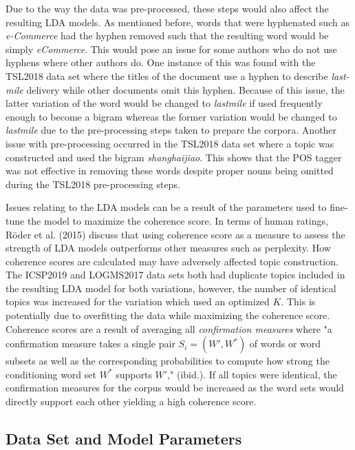 \documentclass[a4paper, 12pt, twoside]{article}
\numberwithin{equation}{section} %
\begin{document}
Due to the way the data was pre-processed, these steps would also affect the resulting LDA models. As mentioned before, words that were hyphenated such as \textit{e-Commerce} had the hyphen removed such that the resulting word would be simply \textit{eCommerce}. This would pose an issue for some authors who do not use hyphens where other authors do. One instance of this was found with the TSL2018 data set where the titles of the document use a hyphen to describe \textit{last-mile} delivery while other documents omit this hyphen. Because of this issue, the latter variation of the word would be changed to \textit{last\textunderscore mile} if used frequently enough to become a bigram whereas the former variation would be changed to \textit{lastmile} due to the pre-processing steps taken to prepare the corpora. Another issue with pre-processing occurred in the TSL2018 data set where a topic was constructed and used the bigram \textit{shanghai\textunderscore jiao}. This shows that the POS tagger was not effective in removing these words despite proper nouns being omitted during the TSL2018 pre-processing steps.  

Issues relating to the LDA models can be a result of the parameters used to fine-tune the model to maximize the coherence score. In terms of human ratings, Röder et al. (2015) discuss that using coherence score as a measure to assess the strength of LDA models outperforms other measures such as perplexity. How coherence scores are calculated may have adversely affected topic construction. The ICSP2019 and LOGMS2017 data sets both had duplicate topics included in the resulting LDA model for both variations, however, the number of identical topics was increased for the variation which used an optimized $K$. This is potentially due to overfitting the data while maximizing the coherence score. Coherence scores are a result of averaging all \textit{confirmation measures} where "a confirmation measure takes a single pair $S_i = (W', W^*)$ of words or word subsets as well as the corresponding probabilities to compute how strong the conditioning word set $W^*$ supports $W'$," (ibid.).  If all topics were identical, the confirmation measures for the corpus would be increased as the word sets would directly support each other yielding a high coherence score. 

\subsection{Data Set and Model Parameters}
\end{document}
